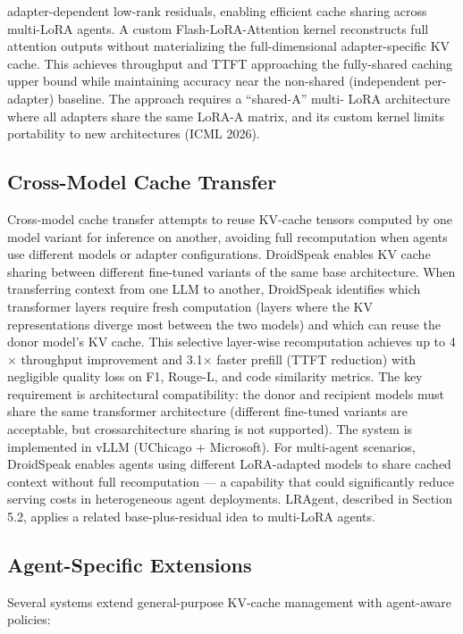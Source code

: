 \documentclass[preprint,12pt]{elsarticle}
\begin{document}
adapter-dependent low-rank residuals, enabling efficient cache sharing across multi-LoRA agents. A custom Flash-LoRA-Attention kernel reconstructs full attention outputs without materializing the full-dimensional adapter-specific KV cache. This achieves throughput and TTFT approaching the fully-shared caching upper bound while maintaining accuracy near the non-shared (independent per-adapter) baseline. The approach requires a ``shared-A'' multi- LoRA architecture where all adapters share the same LoRA-A matrix, and its custom kernel limits portability to new architectures (ICML 2026).


\subsection{Cross-Model Cache Transfer}
Cross-model cache transfer attempts to reuse KV-cache tensors computed by one model variant for inference on another, avoiding full recomputation when agents use different models or adapter configurations. DroidSpeak \cite{v5ref20} enables KV cache sharing between different fine-tuned variants of the same base architecture. When transferring context from one LLM to another, DroidSpeak identifies which transformer layers require fresh computation (layers where the KV representations diverge most between the two models) and which can reuse the donor model's KV cache. This selective layer-wise recomputation achieves up to 4$\times$ throughput improvement and 3.1$\times$ faster prefill (TTFT reduction) with negligible quality loss on F1, Rouge-L, and code similarity metrics. The key requirement is architectural compatibility: the donor and recipient models must share the same transformer architecture (different fine-tuned variants are acceptable, but crossarchitecture sharing is not supported). The system is implemented in vLLM (UChicago + Microsoft). For multi-agent scenarios, DroidSpeak enables agents using different LoRA-adapted models to share cached context without full recomputation --- a capability that could significantly reduce serving costs in heterogeneous agent deployments. LRAgent, described in Section 5.2, applies a related base-plus-residual idea to multi-LoRA agents.


\subsection{Agent-Specific Extensions}
Several systems extend general-purpose KV-cache management with agent-aware policies:
\end{document}
